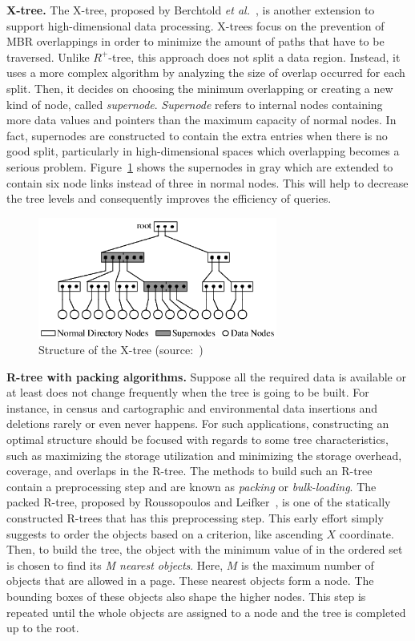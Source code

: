 \documentclass[a4paper,12pt]{article}
\begin{document}
\textbf{X-tree.}
The X-tree, proposed by Berchtold \emph{et al.}~\cite{xtree}, is another extension to support high-dimensional data processing. X-trees focus on the prevention of MBR overlappings in order to minimize the amount of paths that have to be traversed. Unlike $R^+$-tree, this approach does not split a data region. Instead, it uses a more complex algorithm by analyzing the size of overlap occurred for each split. Then, it decides on choosing the minimum overlapping or creating a new kind of node, called \textit{supernode}. \textit{Supernode} refers to internal nodes containing more data values and pointers than the maximum capacity of normal nodes. In fact, supernodes are constructed to contain the extra entries when there is no good split, particularly in high-dimensional spaces which overlapping becomes a serious problem. Figure~\ref{figxtree} shows the supernodes in gray which are extended to contain six node links instead of three in normal nodes. This will help to decrease the tree levels and consequently improves the efficiency of queries.

\begin{figure}
\centering
\includegraphics[width=0.7\textwidth]{xtree}
\caption{Structure of the X-tree (source:~\cite{xtree})}
\label{figxtree}
\end{figure}

\textbf{R-tree with packing algorithms.}
Suppose all the required data is available or at least does not change frequently when the tree is going to be built. For instance, in census and cartographic and environmental data insertions and deletions rarely or even never happens. 
For such applications, constructing an optimal structure should be focused with regards to some tree characteristics, such as maximizing the storage utilization and minimizing the storage overhead, coverage, and overlaps in the R-tree. The methods to build such an R-tree contain a preprocessing step and are known as \textit{packing} or \textit{bulk-loading}. 
The packed R-tree, proposed by Roussopoulos and Leifker~\cite{packedrtree, packedrtree2}, is one of the statically constructed R-trees that has this preprocessing step. This early effort simply suggests to order the objects based on a criterion, like ascending $X$ coordinate. Then, to build the tree, the object with the minimum value of in the ordered set is chosen to find its \textit{M nearest objects}. Here, $M$ is the maximum number of objects that are allowed in a page. These nearest objects form a node. The bounding boxes of these objects also shape the higher nodes. This step is repeated until the whole objects are assigned to a node and the tree is completed up to the root.
\end{document}
